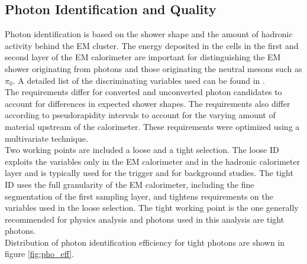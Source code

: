 \subsection{Photon Identification and Quality}
\label{sec:reco:photoID}

\indent Photon identification is based on the shower shape and the amount of hadronic activity behind the EM cluster.  The energy deposited in the cells in the first and second layer of the EM calorimeter are important for distinguishing the EM shower originating from photons and those originating the neutral mesons such as $\pi_0$. A detailed list of the discriminating variables used can be found in \cite{photonID}. \\

\indent The requirements differ for converted and unconverted photon candidates to account for differences in expected shower shapes.  The requirements also differ according to pseudorapidity intervals to account for the varying amount of material upstream of the calorimeter. These requirements were optimized using a multivariate technique.\cite{TMVA}\\

\indent Two working points are included a loose and a tight selection.  The loose ID exploits the variables only in the EM calorimeter and in the hadronic calorimeter layer and is typically used for the trigger and for background studies.  The tight ID uses the full granularity of the EM calorimeter, including the fine segmentation of the first sampling layer, and tightens requirements on the variables used in the loose selection.  The tight working point is the one generally recommended for physics analysis and photons used in this analysis are tight photons.  \\

\indent Distribution of photon identification efficiency for tight photons are shown in figure \ref{fig:pho_eff}. \\

